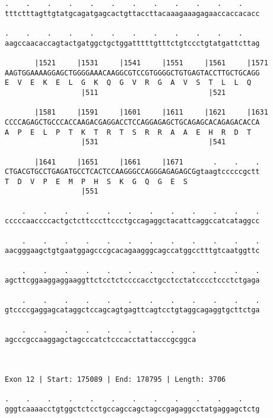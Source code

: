 \documentclass{article}
\begin{document}
\begin{Verbatim}
.    .    .    .    .    .    .    .    .    .    .    .    
tttctttagttgtatgcagatgagcactgttaccttacaaagaaagagaaccaccacacc
                                                            
.    .    .    .    .    .    .    .    .    .    .    .    
aagccaacaccagtactgatggctgctggatttttgtttctgtccctgtatgattcttag
                                                            
       |1521     |1531     |1541     |1551     |1561     |1571
AAGTGGAAAAGGAGCTGGGGAAACAAGGCGTCCGTGGGGCTGTGAGTACCTTGCTGCAGG
E  V  E  K  E  L  G  K  Q  G  V  R  G  A  V  S  T  L  L  Q  
                  |511                          |521        
  
       |1581     |1591     |1601     |1611     |1621     |1631
CCCCAGAGCTGCCCACCAAGACGAGGACCTCCAGGAGAGCTGCAGAGCACAGAGACACCA
A  P  E  L  P  T  K  T  R  T  S  R  R  A  A  E  H  R  D  T  
                  |531                          |541        
  
       |1641     |1651     |1661     |1671       .    .    .
CTGACGTGCCTGAGATGCCTCACTCCAAGGGCCAGGGAGAGAGCGgtaagtcccccgctt
T  D  V  P  E  M  P  H  S  K  G  Q  G  E  S                 
                  |551                                      
  
    .    .    .    .    .    .    .    .    .    .    .    .
cccccaaccccactgctcttcccttccctgccagaggctacattcaggccatcataggcc
                                                            
    .    .    .    .    .    .    .    .    .    .    .    .
aacgggaagctgtgaatggagcccgcacagaagggcagccatggcctttgtcaatggttc
                                                            
    .    .    .    .    .    .    .    .    .    .    .    .
agcttcggaaggaggaaggttctcctctccccacctgcctcctatcccctccctctgaga
                                                            
    .    .    .    .    .    .    .    .    .    .    .    .
gtccccgaggagcataggctccagcagtgagttcagtcctgtaggcagaggtgcttctga
                                                            
    .    .    .    .    .    .    .    .    .
agcccgccaaggagctagcccatctcccacctattacccgcggca
                                             
                                             
 
Exon 12 | Start: 175089 | End: 178795 | Length: 3706
 
.    .    .    .    .    .    .    .    .    .    .    .    
gggtcaaaacctgtggctctcctgccagccagctagccgagaggcctatgaggagctctg
                                                            

\end{Verbatim}
\end{document}
